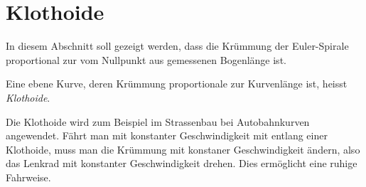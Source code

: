 %
%
%
\section{Klothoide
\label{fresnel:section:klothoide}}
In diesem Abschnitt soll gezeigt werden, dass die Krümmung der 
Euler-Spirale proportional zur vom Nullpunkt aus gemessenen Bogenlänge
ist.

\begin{definition}
Eine ebene Kurve, deren Krümmung proportionale zur Kurvenlänge ist,
heisst {\em Klothoide}.
\end{definition}

Die Klothoide wird zum Beispiel im Strassenbau bei Autobahnkurven
angewendet.
Fährt man mit konstanter Geschwindigkeit mit entlang einer Klothoide,
muss man die Krümmung mit konstaner Geschwindigkeit ändern,
also das Lenkrad mit konstanter Geschwindigkeit drehen.
Dies ermöglicht eine ruhige Fahrweise.

